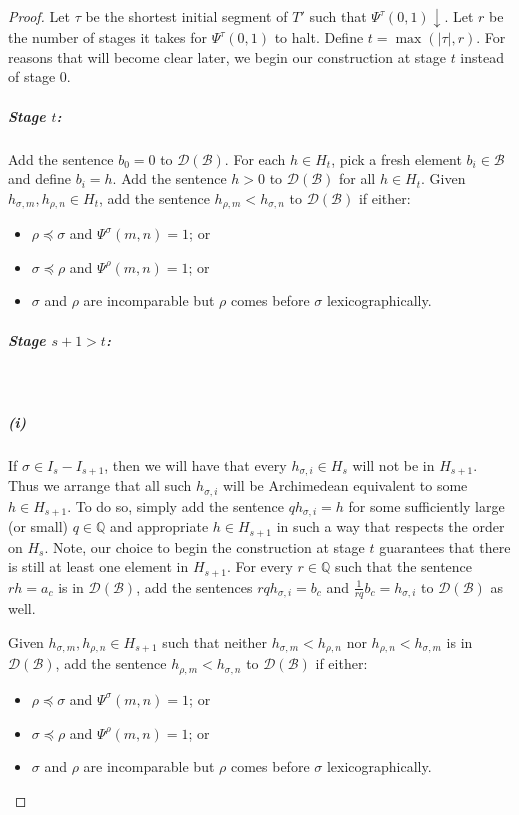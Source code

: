 \documentclass[10pt,a4paper]{amsart}
\newcommand{\B}{\mathcal{B}}
\newcommand{\D}{\mathcal{D}}
\newcommand{\Q}{\mathbb{Q}}
\begin{document}
\begin{proof}
Let $\tau$ be the shortest initial segment of $T'$ such that $\Psi^\tau(0,1) \downarrow$. Let $r$ be the number of stages it takes for $\Psi^\tau(0,1)$ to halt. Define $t=\max(|\tau|,r)$. For reasons that will become clear later, we begin our construction at stage $t$ instead of stage $0$. \\

\subparagraph{Stage $t$:} Add the sentence $b_0=0$ to $\D(\B)$. For each $h \in H_t$, pick a fresh element $b_i \in \B$ and define $b_i=h$. Add the sentence $h>0$ to $\D(\B)$ for all $h\in H_t$. Given $h_{\sigma, m}, h_{\rho,n}\in H_t$, add the sentence $h_{\rho, m}< h_{\sigma,n}$ to $\D(\B)$ if either: 

\begin{itemize}
    \item $\rho \preceq \sigma $ and $\Psi^\sigma(m,n)=1$; or
    \item $\sigma \preceq \rho$ and $\Psi^\rho(m,n)=1$; or
    \item $\sigma$ and $\rho$ are incomparable but $\rho$ comes before $\sigma$ lexicographically.\\ 
\end{itemize}



\subparagraph{Stage $s+1>t$:}\,\\
\subparagraph{(i)} If $\sigma\in I_s - I_{s+1}$, then we will have that every $h_{\sigma,i}\in H_s$ will not be in $H_{s+1}$. Thus we arrange that all such $h_{\sigma,i}$ will be Archimedean equivalent to some $h\in H_{s+1}$. To do so, simply add the sentence $q h_{\sigma,i}= h$ for some sufficiently large (or small) $q\in \Q$ and appropriate $h\in H_{s+1}$ in such a way that respects the order on $H_s$. Note, our choice to begin the construction at stage $t$ guarantees that there is still at least one element in $H_{s+1}$. For every $r\in \Q$ such that the sentence $r h = a_c$ is in $\D(\B)$, add the sentences $rqh_{\sigma, i}=b_c$ and $\frac{1}{rq}b_c=h_{\sigma,i}$ to $\D(\B)$ as well. 

Given $h_{\sigma, m}, h_{\rho,n}\in H_{s+1}$ such that neither $h_{\sigma, m}< h_{\rho, n}$ nor $h_{\rho, n}<h_{\sigma, m}$ is in $\D(\B)$, add the sentence $h_{\rho, m}< h_{\sigma,n}$ to $\D(\B)$ if either: 

\begin{itemize}
    \item $\rho \preceq \sigma $ and $\Psi^\sigma(m,n)=1$; or
    \item $\sigma \preceq \rho$ and $\Psi^\rho(m,n)=1$; or
    \item $\sigma$ and $\rho$ are incomparable but $\rho$ comes before $\sigma$ lexicographically.\\ 
\end{itemize}


\end{proof}
\end{document}
